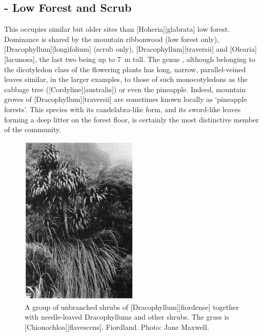 \subsection[\emph{Dracophyllum}-\emph{Olearia} Low Forest and Scrub]{- Low Forest and Scrub}

This occupies similar but older sites than [Hoheria][glabrata] low forest.
Dominance is shared by the mountain ribbonwood (low forest only), [Dracophyllum][longifolium] (scrub only), [Dracophyllum][traversii] and [Olearia][lacunosa], the last two being up to \SI{7}{\metre} tall.
The genus , although belonging to the dicotyledon class of the flowering plants has long, narrow, parallel-veined leaves similar, in the larger examples, to those of such monocotyledons as the cabbage tree ([Cordyline][australis]) or even the pineapple.
Indeed, mountain groves of [Dracophyllum][traversii] are sometimes known locally as `pineapple forests'.
This species with its candelabra-like form, and its sword-like leaves forming a deep litter on the forest floor, is certainly the most distinctive member of the community.

\begin{figure}
	\includegraphics[width=0.5\textwidth]{graphics/figure92dracophyllum.jpg}
	\centering
	\caption[A group of unbranched shrubs of \emph{Dracophyllum fiordense}]{A group of unbranched shrubs of [Dracophyllum][fiordense] together with needle-leaved Dracophyllums and other shrubs.
	The grass is [Chionochloa][flavescens].
	Fiordland.
	Photo: Jane Maxwell.}%
	\label{fig:92dracophyllum}
\end{figure}

